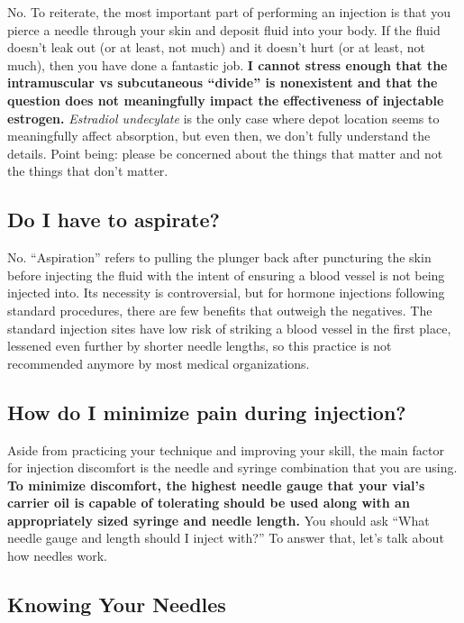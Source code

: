 \documentclass{article}
\begin{document}
No. To reiterate, the most important part of performing an injection is that you pierce a needle through your skin and deposit fluid into your body. If the fluid doesn’t leak out (or at least, not much) and it doesn’t hurt (or at least, not much), then you have done a fantastic job. \textbf{I cannot stress enough that the intramuscular vs subcutaneous “divide” is nonexistent and that the question does not meaningfully impact the effectiveness of injectable estrogen.} \textit{Estradiol undecylate} is the only case where depot location seems to meaningfully affect absorption, but even then, we don’t fully understand the details. Point being: please be concerned about the things that matter and not the things that don’t matter.

\subsection{Do I have to aspirate?}

No. “Aspiration” refers to pulling the plunger back after puncturing the skin before injecting the fluid with the intent of ensuring a blood vessel is not being injected into. Its necessity is controversial, but for hormone injections following standard procedures, there are few benefits that outweigh the negatives. The standard injection sites have low risk of striking a blood vessel in the first place, lessened even further by shorter needle lengths, so this practice is not recommended anymore by most medical organizations.

\subsection{How do I minimize pain during injection?}

Aside from practicing your technique and improving your skill, the main factor for injection discomfort is the needle and syringe combination that you are using. \textbf{To minimize discomfort, the highest needle gauge that your vial’s carrier oil is capable of tolerating should be used along with an appropriately sized syringe and needle length. }You should ask “What needle gauge and length should I inject with?” To answer that, let’s talk about how needles work.

\subsection*{Knowing Your Needles}
\end{document}
